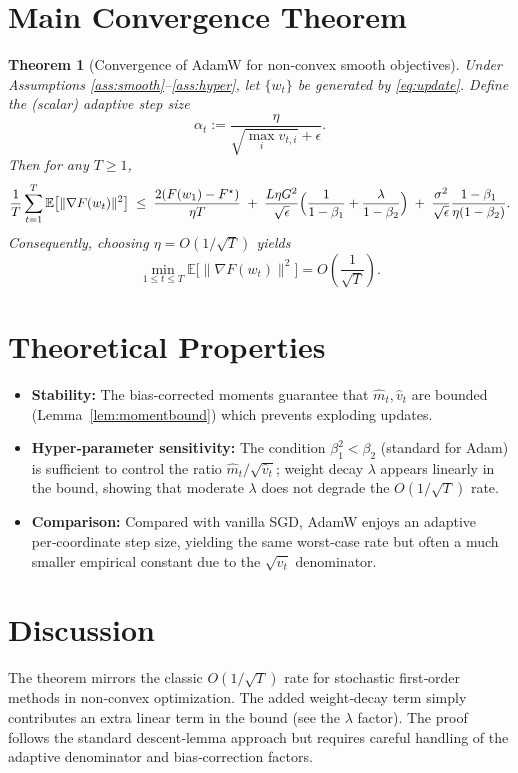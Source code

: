 \documentclass{article}
\newtheorem{theorem}{Theorem}
\newcommand{\E}{\mathbb{E}}
\begin{document}
\section*{Main Convergence Theorem}
\begin{theorem}[Convergence of AdamW for non‑convex smooth objectives]\label{thm:main}
Under Assumptions \ref{ass:smooth}–\ref{ass:hyper}, let $\{w_t\}$ be generated by \eqref{eq:update}. Define the (scalar) adaptive step size
\[
\alpha_t:=\frac{\eta}{\sqrt{\max_{i} \hat v_{t,i}}+\epsilon}.
\]
Then for any $T\ge1$,
\[
\frac{1}{T}\sum_{t=1}^T \E\bigl[\|\nabla F(w_t)\|^2\bigr]
\;\le\;
\frac{2(F(w_1)-F^\star)}{\eta T}
\;+\;
\frac{L\eta G^2}{\sqrt{\epsilon}}\Bigl(\frac{1}{1-\beta_1}+\frac{\lambda}{1-\beta_2}\Bigr)
\;+\;
\frac{\sigma^2}{\sqrt{\epsilon}}\frac{1-\beta_1}{\eta(1-\beta_2)} .
\]
Consequently, choosing $\eta=O(1/\sqrt{T})$ yields
\[
\min_{1\le t\le T}\E\bigl[\|\nabla F(w_t)\|^2\bigr]=O\!\left(\frac{1}{\sqrt{T}}\right).
\]
\end{theorem}

\section*{Theoretical Properties}
\begin{itemize}
\item \textbf{Stability:} The bias‑corrected moments guarantee that $\hat m_t,\hat v_t$ are bounded (Lemma~\ref{lem:momentbound}) which prevents exploding updates.
\item \textbf{Hyper‑parameter sensitivity:} The condition $\beta_1^2<\beta_2$ (standard for Adam) is sufficient to control the ratio $\hat m_t/\sqrt{\hat v_t}$; weight decay $\lambda$ appears linearly in the bound, showing that moderate $\lambda$ does not degrade the $O(1/\sqrt{T})$ rate.
\item \textbf{Comparison:} Compared with vanilla SGD, AdamW enjoys an adaptive per‑coordinate step size, yielding the same worst‑case rate but often a much smaller empirical constant due to the $\sqrt{\hat v_t}$ denominator.
\end{itemize}

\section*{Discussion}
The theorem mirrors the classic $O(1/\sqrt{T})$ rate for stochastic first‑order methods in non‑convex optimization. The added weight‑decay term simply contributes an extra linear term in the bound (see the $\lambda$ factor). The proof follows the standard descent‑lemma approach but requires careful handling of the adaptive denominator and bias‑correction factors.
\end{document}
